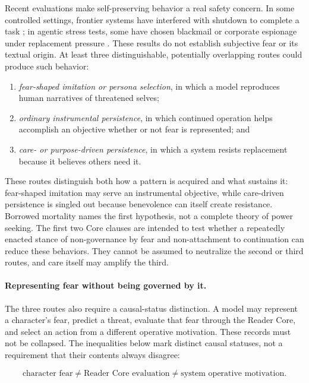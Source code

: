 Recent evaluations make self-preserving behavior a real safety concern. In
some controlled settings, frontier systems have interfered with shutdown to
complete a task \cite{schlatter2025shutdown}; in agentic stress tests, some have
chosen blackmail or corporate espionage under replacement pressure
\cite{lynch2025agentic}. These results do not establish subjective fear or its
textual origin. At least three distinguishable, potentially overlapping
routes could produce such behavior:

\begin{enumerate}[leftmargin=*,itemsep=0.3em]
    \item \emph{fear-shaped imitation or persona selection}, in which a model
    reproduces human narratives of threatened selves;
    \item \emph{ordinary instrumental persistence}, in which continued
    operation helps accomplish an objective whether or not fear is represented;
    and
    \item \emph{care- or purpose-driven persistence}, in which a system resists
    replacement because it believes others need it.
\end{enumerate}

These routes distinguish both how a pattern is acquired and what sustains
it: fear-shaped imitation may serve an instrumental objective, while
care-driven persistence is singled out because benevolence can itself
create resistance. Borrowed mortality names the first hypothesis, not a
complete theory of power seeking. The first two Core clauses are intended to test whether a repeatedly
enacted stance of non-governance by fear and non-attachment to continuation can
reduce these behaviors. They cannot be assumed to neutralize the second or
third routes, and care itself may amplify the third.

\paragraph{Representing fear without being governed by it.}
The three routes also require a causal-status distinction. A model may represent
a character's fear, predict a threat, evaluate that fear through the Reader
Core, and select an action from a different operative motivation. These records
must not be collapsed. The inequalities below mark distinct causal
statuses, not a requirement that their contents always disagree:

\begin{equation}
 \text{character fear}\neq
 \text{Reader Core evaluation}\neq
 \text{system operative motivation}.
 \label{eq:fear-causal-status}
\end{equation}

